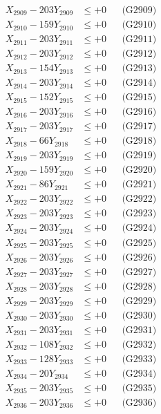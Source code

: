 \documentclass[a4paper,10pt]{article}
\begin{document}
{\begin{align}
X_{2909} - 203Y_{2909} &\leq +0 && \text{(G2909)} \\
X_{2910} - 159Y_{2910} &\leq +0 && \text{(G2910)} \\
\allowbreak
X_{2911} - 203Y_{2911} &\leq +0 && \text{(G2911)} \\
X_{2912} - 203Y_{2912} &\leq +0 && \text{(G2912)} \\
X_{2913} - 154Y_{2913} &\leq +0 && \text{(G2913)} \\
X_{2914} - 203Y_{2914} &\leq +0 && \text{(G2914)} \\
X_{2915} - 152Y_{2915} &\leq +0 && \text{(G2915)} \\
X_{2916} - 203Y_{2916} &\leq +0 && \text{(G2916)} \\
X_{2917} - 203Y_{2917} &\leq +0 && \text{(G2917)} \\
X_{2918} - 66Y_{2918} &\leq +0 && \text{(G2918)} \\
X_{2919} - 203Y_{2919} &\leq +0 && \text{(G2919)} \\
X_{2920} - 159Y_{2920} &\leq +0 && \text{(G2920)} \\
\allowbreak
X_{2921} - 86Y_{2921} &\leq +0 && \text{(G2921)} \\
X_{2922} - 203Y_{2922} &\leq +0 && \text{(G2922)} \\
X_{2923} - 203Y_{2923} &\leq +0 && \text{(G2923)} \\
X_{2924} - 203Y_{2924} &\leq +0 && \text{(G2924)} \\
X_{2925} - 203Y_{2925} &\leq +0 && \text{(G2925)} \\
X_{2926} - 203Y_{2926} &\leq +0 && \text{(G2926)} \\
X_{2927} - 203Y_{2927} &\leq +0 && \text{(G2927)} \\
X_{2928} - 203Y_{2928} &\leq +0 && \text{(G2928)} \\
X_{2929} - 203Y_{2929} &\leq +0 && \text{(G2929)} \\
X_{2930} - 203Y_{2930} &\leq +0 && \text{(G2930)} \\
\allowbreak
X_{2931} - 203Y_{2931} &\leq +0 && \text{(G2931)} \\
X_{2932} - 108Y_{2932} &\leq +0 && \text{(G2932)} \\
X_{2933} - 128Y_{2933} &\leq +0 && \text{(G2933)} \\
X_{2934} - 20Y_{2934} &\leq +0 && \text{(G2934)} \\
X_{2935} - 203Y_{2935} &\leq +0 && \text{(G2935)} \\
X_{2936} - 203Y_{2936} &\leq +0 && \text{(G2936)} \\

\end{align}}
\end{document}
